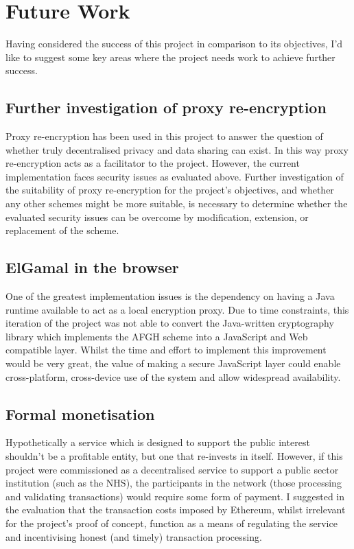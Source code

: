 \section{Future Work}

Having considered the success of this project in comparison to its objectives, I'd like to suggest some key areas where the project needs work to achieve further success.

\subsection{Further investigation of proxy re-encryption}

Proxy re-encryption has been used in this project to answer the question of whether truly decentralised privacy and data sharing can exist. In this way proxy re-encryption acts as a facilitator to the project. However, the current implementation faces security issues as evaluated above. Further investigation of the suitability of proxy re-encryption for the project's objectives, and whether any other schemes might be more suitable, is necessary to determine whether the evaluated security issues can be overcome by modification, extension, or replacement of the scheme.

\subsection{ElGamal in the browser}

One of the greatest implementation issues is the dependency on having a Java runtime available to act as a local encryption proxy. Due to time constraints, this iteration of the project was not able to convert the Java-written cryptography library which implements the AFGH scheme into a JavaScript and Web compatible layer. Whilst the time and effort to implement this improvement would be very great, the value of making a secure JavaScript layer could enable cross-platform, cross-device use of the system and allow widespread availability.

\subsection{Formal monetisation}

Hypothetically a service which is designed to support the public interest shouldn't be a profitable entity, but one that re-invests in itself. However, if this project were commissioned as a decentralised service to support a public sector institution (such as the NHS), the participants in the network (those processing and validating transactions) would require some form of payment. I suggested in the evaluation that the transaction costs imposed by Ethereum, whilst irrelevant for the project's proof of concept, function as a means of regulating the service and incentivising honest (and timely) transaction processing.

